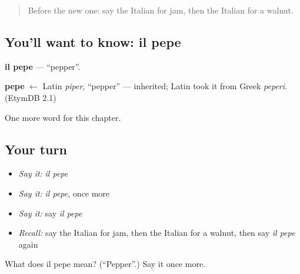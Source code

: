 \label{lesson:IT-C110-pepe}



\begin{quote}
Before the new one: say the Italian for jam, then the Italian for a walnut.
\end{quote}

\subsection*{You'll want to know: il pepe}
\textbf{il pepe} — \textquotedblleft{}pepper\textquotedblright{}.

\begin{cousinweb}
\textbf{pepe} $\leftarrow$ Latin \emph{piper}, \textquotedblleft{}pepper\textquotedblright{} — inherited; Latin took it from Greek \emph{peperi}. (EtymDB 2.1)
\end{cousinweb}

\begin{grammarlens}[title={What you've built}]
One more word for this chapter.
\end{grammarlens}

\subsection*{Your turn}
\begin{itemize}
\raggedright
  \item \emph{Say it:} \emph{il pepe}
  \item \emph{Say it:} \emph{il pepe}, once more
  \item \emph{Say it:} say \emph{il pepe}
  \item \emph{Recall:} say the Italian for jam, then the Italian for a walnut, then say \emph{il pepe} again
\end{itemize}

\begin{tcolorbox}[breakable,colback=teal!4,colframe=teal!35!black,title={Before you move on}]
What does il pepe mean? (\textquotedblleft{}Pepper\textquotedblright{}.) Say it once more.
\end{tcolorbox}
